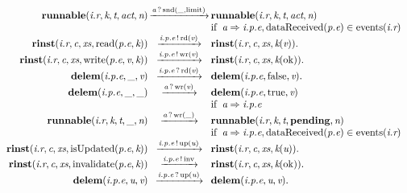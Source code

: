 \[\begin{array}{r@{}c@{}llllll}
\\\Prule{\Tstep{\Trunnable{\Tr{\Tvar{R}}{\Tvar{I}}}{\Tvar{K}}{\Tvar{T}}{\Tvar{Act}}{\Tvar{N}}}{\Thear{\Tvar{A}}{\Tsnd{\_}{\Tlimit}}}{\Trunnable{\Tr{\Tvar{R}}{\Tvar{I}}}{\Tvar{K}}{\Tvar{T}}{\Tvar{Act}}{\Tvar{N}}}}{\Tconnect{\Tvar{A}}{\Tep{\Tvar{E}}{\Tvar{P}}{\Tvar{I}}},\Tmember{\TdataReceived{\Te{\Tvar{E}}{\Tvar{P}}}}{\Tevents{\Tr{\Tvar{R}}{\Tvar{I}}}}}
\\\Pfact{\Tstep{\Trinst{\Tr{\Tvar{R}}{\Tvar{I}}}{\Tvar{C}}{\Tvar{Xs}}{\TrteRead{\Te{\Tvar{E}}{\Tvar{P}}}{\Tvar{K}}}}{\Tsay{\Tep{\Tvar{E}}{\Tvar{P}}{\Tvar{I}}}{\Trd{\Tvar{V}}}}{\Trinst{\Tr{\Tvar{R}}{\Tvar{I}}}{\Tvar{C}}{\Tvar{Xs}}{\Tap{\Tvar{K}}{\Tvar{V}}}}}
\\\Pfact{\Tstep{\Trinst{\Tr{\Tvar{R}}{\Tvar{I}}}{\Tvar{C}}{\Tvar{Xs}}{\TrteWrite{\Te{\Tvar{E}}{\Tvar{P}}}{\Tvar{V}}{\Tvar{K}}}}{\Tsay{\Tep{\Tvar{E}}{\Tvar{P}}{\Tvar{I}}}{\Twr{\Tvar{V}}}}{\Trinst{\Tr{\Tvar{R}}{\Tvar{I}}}{\Tvar{C}}{\Tvar{Xs}}{\Tap{\Tvar{K}}{\Tok}}}}
\\\Pfact{\Tstep{\Tdelem{\Tep{\Tvar{E}}{\Tvar{P}}{\Tvar{I}}}{\_}{\Tvar{V}}}{\Thear{\Tep{\Tvar{E}}{\Tvar{P}}{\Tvar{I}}}{\Trd{\Tvar{V}}}}{\Tdelem{\Tep{\Tvar{E}}{\Tvar{P}}{\Tvar{I}}}{\Tfalse}{\Tvar{V}}}}
\\\Prule{\Tstep{\Tdelem{\Tep{\Tvar{E}}{\Tvar{P}}{\Tvar{I}}}{\_}{\_}}{\Thear{\Tvar{A}}{\Twr{\Tvar{V}}}}{\Tdelem{\Tep{\Tvar{E}}{\Tvar{P}}{\Tvar{I}}}{\Ttrue}{\Tvar{V}}}}{\Tconnect{\Tvar{A}}{\Tep{\Tvar{E}}{\Tvar{P}}{\Tvar{I}}}}
\\\Prule{\Tstep{\Trunnable{\Tr{\Tvar{R}}{\Tvar{I}}}{\Tvar{K}}{\Tvar{T}}{\_}{\Tvar{N}}}{\Thear{\Tvar{A}}{\Twr{\_}}}{\Trunnable{\Tr{\Tvar{R}}{\Tvar{I}}}{\Tvar{K}}{\Tvar{T}}{\Tpending}{\Tvar{N}}}}{\Tconnect{\Tvar{A}}{\Tep{\Tvar{E}}{\Tvar{P}}{\Tvar{I}}},\Tmember{\TdataReceived{\Te{\Tvar{E}}{\Tvar{P}}}}{\Tevents{\Tr{\Tvar{R}}{\Tvar{I}}}}}
\\\Pfact{\Tstep{\Trinst{\Tr{\Tvar{R}}{\Tvar{I}}}{\Tvar{C}}{\Tvar{Xs}}{\TrteIsUpdated{\Te{\Tvar{E}}{\Tvar{P}}}{\Tvar{K}}}}{\Tsay{\Tep{\Tvar{E}}{\Tvar{P}}{\Tvar{I}}}{\Tup{\Tvar{U}}}}{\Trinst{\Tr{\Tvar{R}}{\Tvar{I}}}{\Tvar{C}}{\Tvar{Xs}}{\Tap{\Tvar{K}}{\Tvar{U}}}}}
\\\Pfact{\Tstep{\Trinst{\Tr{\Tvar{R}}{\Tvar{I}}}{\Tvar{C}}{\Tvar{Xs}}{\TrteInvalidate{\Te{\Tvar{E}}{\Tvar{P}}}{\Tvar{K}}}}{\Tsay{\Tep{\Tvar{E}}{\Tvar{P}}{\Tvar{I}}}{\Tinv}}{\Trinst{\Tr{\Tvar{R}}{\Tvar{I}}}{\Tvar{C}}{\Tvar{Xs}}{\Tap{\Tvar{K}}{\Tok}}}}
\\\Pfact{\Tstep{\Tdelem{\Tep{\Tvar{E}}{\Tvar{P}}{\Tvar{I}}}{\Tvar{U}}{\Tvar{V}}}{\Thear{\Tep{\Tvar{E}}{\Tvar{P}}{\Tvar{I}}}{\Tup{\Tvar{U}}}}{\Tdelem{\Tep{\Tvar{E}}{\Tvar{P}}{\Tvar{I}}}{\Tvar{U}}{\Tvar{V}}}}

\end{array}\]
